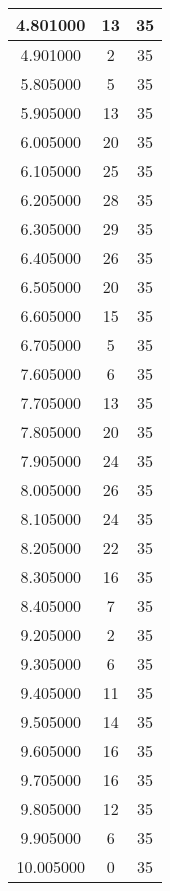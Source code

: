 \begin{longtable}[htbp]{|c|c|c|}
4.801000 & 13 & 35 \\ \hline
4.901000 & 2 & 35 \\ \hline
5.805000 & 5 & 35 \\ \hline
5.905000 & 13 & 35 \\ \hline
6.005000 & 20 & 35 \\ \hline
6.105000 & 25 & 35 \\ \hline
6.205000 & 28 & 35 \\ \hline
6.305000 & 29 & 35 \\ \hline
6.405000 & 26 & 35 \\ \hline
6.505000 & 20 & 35 \\ \hline
6.605000 & 15 & 35 \\ \hline
6.705000 & 5 & 35 \\ \hline
7.605000 & 6 & 35 \\ \hline
7.705000 & 13 & 35 \\ \hline
7.805000 & 20 & 35 \\ \hline
7.905000 & 24 & 35 \\ \hline
8.005000 & 26 & 35 \\ \hline
8.105000 & 24 & 35 \\ \hline
8.205000 & 22 & 35 \\ \hline
8.305000 & 16 & 35 \\ \hline
8.405000 & 7 & 35 \\ \hline
9.205000 & 2 & 35 \\ \hline
9.305000 & 6 & 35 \\ \hline
9.405000 & 11 & 35 \\ \hline
9.505000 & 14 & 35 \\ \hline
9.605000 & 16 & 35 \\ \hline
9.705000 & 16 & 35 \\ \hline
9.805000 & 12 & 35 \\ \hline
9.905000 & 6 & 35 \\ \hline
10.005000 & 0 & 35 \\ \hline
\end{longtable}
